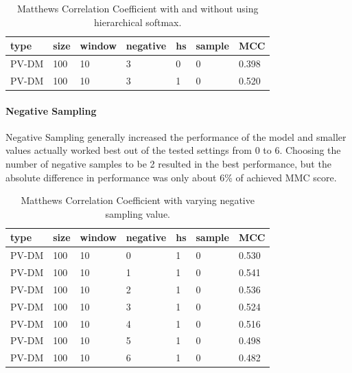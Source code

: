 \begin{table}[h]
  \begin{center}
  \begin{tabular}{ *6l | l }
    \toprule
    type & size & window & negative & hs & sample & MCC  \\
    \midrule
    PV-DM & 100 & 10 & 3 & 0 & 0 & 0.398 \\
    PV-DM & 100 & 10 & 3 & 1 & 0 & 0.520 \\
    \bottomrule
  \end{tabular}
  \caption{Matthews Correlation Coefficient with and without using hierarchical softmax.}
\label{tab:Paragraph Vector Parameter Results Hierarchical Softmax}
\end{center}
\end{table}

\paragraph{Negative Sampling}
Negative Sampling generally increased the performance of the model and smaller values actually worked best out of the tested settings from 0 to 6. Choosing the number of negative samples to be 2 resulted in the best performance, but the absolute difference in performance was only about 6\% of achieved MMC score.

\begin{table}[h]
  \begin{center}
  \begin{tabular}{ *6l | l }
    \toprule
    type & size & window & negative & hs & sample & MCC  \\
    \midrule
    PV-DM & 100 & 10 & 0 & 1 & 0 & 0.530 \\
    PV-DM & 100 & 10 & 1 & 1 & 0 & 0.541 \\
    PV-DM & 100 & 10 & 2 & 1 & 0 & 0.536 \\
    PV-DM & 100 & 10 & 3 & 1 & 0 & 0.524 \\
    PV-DM & 100 & 10 & 4 & 1 & 0 & 0.516 \\
    PV-DM & 100 & 10 & 5 & 1 & 0 & 0.498 \\
    PV-DM & 100 & 10 & 6 & 1 & 0 & 0.482 \\
    \bottomrule
  \end{tabular}
  \caption{Matthews Correlation Coefficient with varying negative sampling value.}
\label{tab:Paragraph Vector Parameter Results Hierarchical Softmax}
\end{center}
\end{table}

